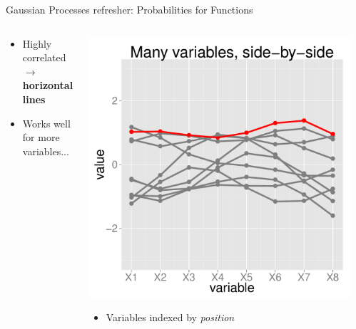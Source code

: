 \documentclass[final,t]{beamer}\usepackage[]{graphicx}\usepackage[]{color}
\makeatletter
\def\maxwidth{ %
  \ifdim\Gin@nat@width>\linewidth
    \linewidth
  \else
    \Gin@nat@width
  \fi
}
\newenvironment{knitrout}{}{} %
\makeatother
\begin{document}
\begin{frame}[fragile]
\begin{block}{Gaussian Processes refresher: Probabilities for Functions}
\begin{columns}[T]
\begin{column}{0.12\linewidth}
        \begin{itemize} \scriptsize
          \item Highly correlated $\rightarrow$ \textbf{horizontal lines}
          \item Works well for more variables...
        \end{itemize}
      \end{column}
      \begin{column}{0.12\linewidth}
\begin{knitrout}
\color{fgcolor}
\includegraphics[width=\maxwidth]{figure/many_side_by_side} 

\end{knitrout}

        \begin{itemize} \scriptsize
          \item Variables indexed by \textit{position}
        \end{itemize}
      \end{column}
      \begin{column}{0.40\linewidth}
      \end{column}
    \end{columns}
  \end{block}
\end{frame}
\end{document}

